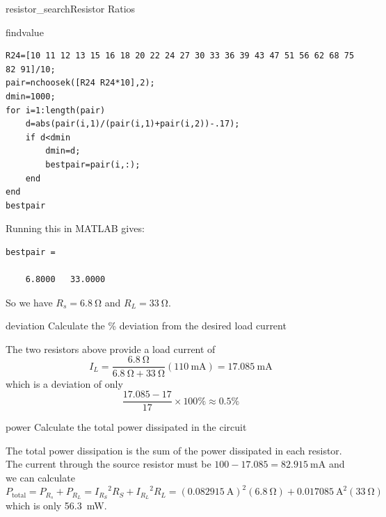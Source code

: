 \begin{mainquestion}{resistor_search}{Resistor Ratios}
\begin{partquestion}{findvalue}
\begin{answer}
\clearpage
\begin{lstlisting}
R24=[10 11 12 13 15 16 18 20 22 24 27 30 33 36 39 43 47 51 56 62 68 75 82 91]/10;
pair=nchoosek([R24 R24*10],2);
dmin=1000;
for i=1:length(pair)
    d=abs(pair(i,1)/(pair(i,1)+pair(i,2))-.17);
    if d<dmin
        dmin=d;
        bestpair=pair(i,:);
    end
end
bestpair

\end{lstlisting}

Running this in MATLAB gives:

\begin{lstlisting}
bestpair =

    6.8000   33.0000
\end{lstlisting}
So we have $R_s=\qty{6.8}{\ohm}$ and $R_L=\qty{33}{\ohm}$.
\end{answer}
\end{partquestion}

\begin{partquestion}{deviation}
{Calculate the \% deviation from the desired load current}

\begin{answer}
The two resistors above provide a load current of
\[I_L=\frac{\qty{6.8}{\ohm}}{\qty{6.8}{\ohm} + \qty{33}{\ohm}}(\qty{110}{\milli\ampere}) = \qty{17.085}{\milli\ampere}\]
which is a deviation of only
\[\frac{17.085-17}{17}\times100\% \approx0.5\%\]
\end{answer}
\end{partquestion}

\begin{partquestion}{power}
{Calculate the total power dissipated in the circuit}

\begin{answer}
The total power dissipation is the sum of the power dissipated in each resistor. The current through the source resistor must be $100 - 17.085 = \qty{82.915}{\milli\ampere}$ and we can calculate
\[
P_{\text{total}} = P_{R_s} + P_{R_L} = {I_{R_S}}^2 R_S +{I_{R_L}}^2 R_L = (\qty{0.082915}{\ampere})^2(\qty{6.8}{\ohm})+\qty{0.017085}{\ampere}^2(\qty{33}{\ohm})
\]
which is only \qty{56.3}{\milli\watt}.
\end{answer}
\end{partquestion}

\end{mainquestion}